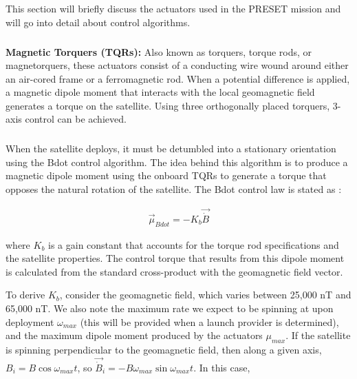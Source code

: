 \documentclass{article}
\begin{document}
\subsection{\color{black}{Attitude Control Maneuvers}}

This section will briefly discuss the actuators used in the PRESET mission and will go into detail about control algorithms. 

\subsubsection{\color{black}{Actuation}}

\textbf{Magnetic Torquers (TQRs):} Also known as torquers, torque rods, or magnetorquers, these actuators consist of a conducting wire wound around either an air-cored frame or a ferromagnetic rod. When a potential difference is applied, a magnetic dipole moment that interacts with the local geomagnetic field generates a torque on the satellite. Using three orthogonally placed torquers, 3-axis control can be achieved.

\subsubsection{\color{black}{Bdot Detumbling Algorithm}}

When the satellite deploys, it must be detumbled into a stationary orientation using the Bdot control algorithm. The idea behind this algorithm is to produce a magnetic dipole moment using the onboard TQRs to generate a torque that opposes the natural rotation of the satellite. The Bdot control law is stated as \cite{stickler}:

\begin{align}
    \vec{\mu}_{Bdot} = -K_{b} \Vec{\dot{B}} \tag{3.24}
\end{align}

\noindent where $K_{b}$ is a gain constant that accounts for the torque rod specifications and the satellite properties. The control torque that results from this dipole moment is calculated from the standard cross-product with the geomagnetic field vector. 

To derive $K_{b}$, consider the geomagnetic field, which varies between 25,000 nT and 65,000 nT. We also note the maximum rate we expect to be spinning at upon deployment $\omega_{max}$ (this will be provided when a launch provider is determined), and the maximum dipole moment produced by the actuators $\mu_{max}$. If the satellite is spinning perpendicular to the geomagnetic field, then along a given axis, $B_{i} = B \cos{\omega_{max} t}$, so $\vec{\dot{B}}_{i} = - B \omega_{max} \sin{\omega_{max} t}$. In this case, 
\end{document}
